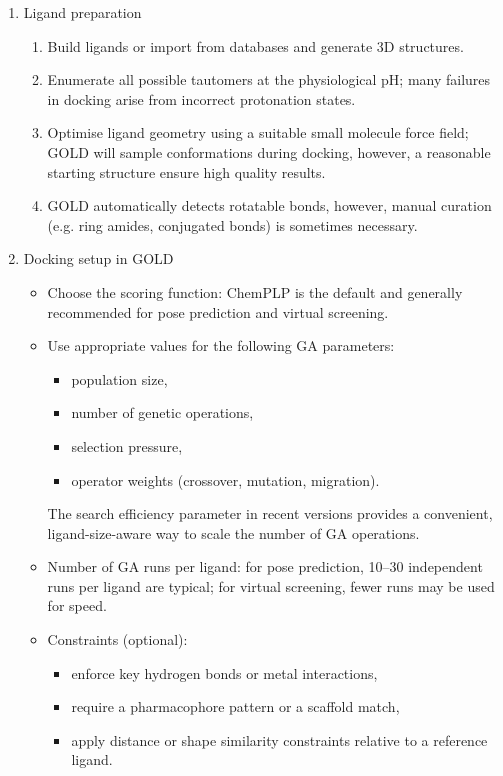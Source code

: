 \documentclass[12pt, a4paper]{article}
\begin{document}
\begin{enumerate}
\item Ligand preparation

\begin{enumerate}
    \item Build ligands or import from databases and generate 3D structures.
    \item Enumerate all possible tautomers at the physiological pH; many failures in docking arise from incorrect protonation states.
    \item Optimise ligand geometry using a suitable small molecule force field; GOLD will sample conformations during docking, however, a reasonable starting structure ensure high quality results.
    \item GOLD automatically detects rotatable bonds, however, manual curation (e.g. ring amides, conjugated bonds) is sometimes necessary.
\end{enumerate}

\item Docking setup in GOLD

\begin{itemize}
    \item Choose the scoring function: ChemPLP is the default and generally recommended for pose prediction and virtual screening.
    \item Use appropriate values for the following GA parameters:
    \begin{itemize}
        \item population size,
        \item number of genetic operations,
        \item selection pressure,
        \item operator weights (crossover, mutation, migration).
    \end{itemize}
    The search efficiency parameter in recent versions provides a convenient, ligand-size-aware way to scale the number of GA operations.
    \item Number of GA runs per ligand: for pose prediction, 10--30 independent runs per ligand are typical; for virtual screening, fewer runs may be used for speed.
    \item Constraints (optional):
    \begin{itemize}
        \item enforce key hydrogen bonds or metal interactions,
        \item require a pharmacophore pattern or a scaffold match,
        \item apply distance or shape similarity constraints relative to a reference ligand.
    \end{itemize}
\end{itemize}


\end{enumerate}
\end{document}
